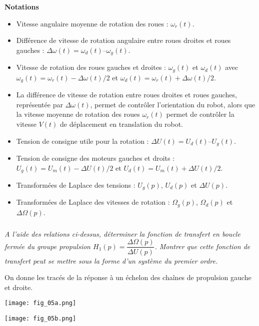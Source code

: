 \begin{multicols}{2}
\textbf{Notations}
\begin{itemize}
\item Vitesse angulaire moyenne de rotation des roues : $\omega_r (t)$. 
\item Différence de vitesse de rotation angulaire entre roues droites et roues gauches : $\Delta\omega(t) = \omega_d (t) – \omega_g (t)$.
\item Vitesse de rotation des roues gauches et droites : $\omega_g (t)$ et $\omega_d (t)$ avec $\omega_g (t)  = \omega_r (t)  - \Delta \omega(t)/2$  et $\omega_d (t)  = \omega_r (t)  + \Delta\omega(t)/2$. 
\item La différence de vitesse de rotation entre roues droites et roues gauches, représentée par $\Delta \omega(t)$, permet de contrôler l’orientation du robot, alors que la vitesse moyenne de rotation des roues $\omega_r (t)$  permet de contrôler la vitesse $V(t)$ de déplacement en translation du robot. 
\item Tension de consigne utile pour la rotation : $\Delta U(t)  = U_d (t)  – U_g (t)$. 
\item Tension de consigne des moteurs gauches et droits :
$U_g(t)=U_m (t)-\Delta U(t)/2$
et $U_d (t)=U_m (t)+\Delta U(t)/2$. 
\item Transformées de Laplace des tensions : $U_g (p)$, $U_d (p)$ et $\Delta U(p)$. 
\item Transformées de Laplace des vitesses de rotation : $\Omega_g (p)$, $\Omega_d (p)$ et $\Delta \Omega(p)$. 
\end{itemize}


\subparagraph{}
\textit{A l’aide des relations ci-dessus, déterminer la fonction de transfert en boucle fermée du groupe propulsion 
$H_1(p)=\dfrac{\Delta\Omega(p)}{\Delta U(p)}$. 
Montrer que cette fonction de transfert peut se mettre sous la forme d’un système du premier ordre.}
\ifprof
\begin{corrige}
\end{corrige}
\else
\fi

On donne les tracés de la réponse à un échelon des chaînes de propulsion gauche et droite.  

\begin{center}
\texttt{[image: fig\_05a.png]}
\end{center}

\begin{center}
\texttt{[image: fig\_05b.png]}
\end{center}



\end{multicols}
